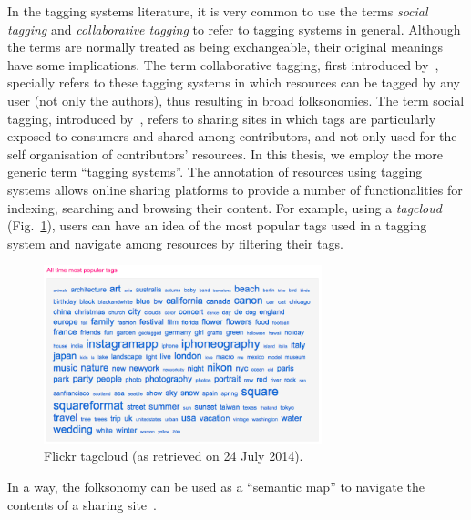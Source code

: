 In the tagging systems literature, it is very common to use the terms \emph{social tagging} and \emph{collaborative tagging} to refer to tagging systems in general. Although the terms are normally treated as being exchangeable, their original meanings have some implications. 
The term collaborative tagging, first introduced by~\cite{golder2006}, specially refers to these tagging systems in which resources can be tagged by any user (not only the authors), thus resulting in broad folksonomies. 
The term social tagging, introduced by~\cite{marlow2006}, refers to sharing sites in which tags are  particularly exposed to consumers and shared among contributors, and not only used for the self organisation of contributors' resources. In this thesis, we employ the more generic term ``tagging systems''.
The annotation of resources using tagging systems allows online sharing platforms to provide a number of functionalities for indexing, searching and browsing their content. For example, using a \emph{tagcloud} (Fig.~\ref{fig:tagcloud}), users can have an idea of the most popular tags used in a tagging system and navigate among resources by filtering their tags.
\begin{figure}[t]
  \centering
  \includegraphics[width=0.72\textwidth]{ch01_introduction/pics/flickr_tagcloud}
  \caption[Flickr tagcloud]{Flickr tagcloud (as retrieved on 24 July 2014).}
  \label{fig:tagcloud}
\end{figure}
In a way, the folksonomy can be used as a ``semantic map'' to navigate the contents of a sharing site~\citep{Cattuto2006}.

